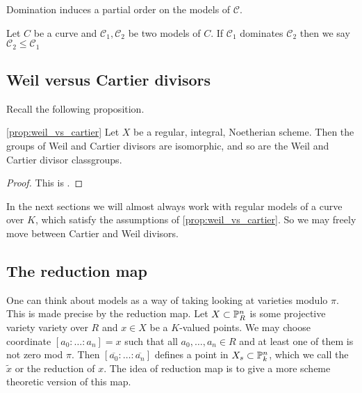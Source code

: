 Domination induces a partial order on the models of $\mathscr C$. 
\begin{definition}
	Let $C$ be a curve and $\mathscr C_1, \mathscr C_2$ be two models of $C$. 
	If $\mathscr C_1$ dominates $\mathscr C_2$ then we say $\mathscr C_2 \le \mathscr C_1$
\end{definition}





\subsection{Weil versus Cartier divisors} \label{sec:weil_versus_cartier_divisors}

Recall the following proposition. 
\begin{proposition}\cref{prop:weil_vs_cartier}
	Let $X$ be a regular, integral, Noetherian scheme. Then the groups of Weil and Cartier divisors are isomorphic, and so are the Weil and Cartier divisor classgroups. 
\end{proposition}
\begin{proof}
	This is \cite[prop.\ 7.2.16]{liuAlgebraicGeometryArithmetic2002}. 
\end{proof}

In the next sections we will almost always work with regular models of a curve over $K$, which satisfy the assumptions of \cref{prop:weil_vs_cartier}. So we may freely move between Cartier and Weil divisors. 

\subsection{The reduction map} \label{sec:the_reduction_map_models}
One can think about models as a way of taking looking at varieties modulo $\pi$. 
This is made precise by the reduction map. 
Let $ X\subset \mathbb{P}^{n}_R$ is some projective variety variety over $R$ and $x \in X$ be a $K$-valued points. 
We may choose coordinate $[a_0:\ldots:a_n] = x$ such that all $a_0, \ldots, a_n \in R$ and at least one of them is not zero mod $\pi$.  
Then $[\overline{a_0}: \ldots :\overline{a_n}]$ defines a point in $X_s \subset  \mathbb{P}^{n}_k$, which we call the $\tilde x$ or the reduction of $x$.  
The idea of reduction map is to give a more scheme theoretic version of this map. 

